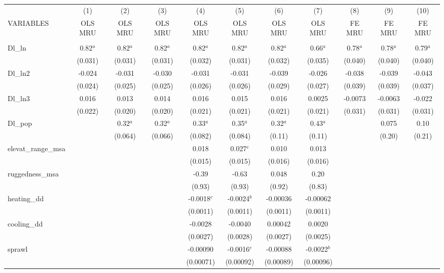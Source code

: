\documentclass[]{article}
\begin{document}
\begin{tabular}{lcccccccccc} \hline
 & (1) & (2) & (3) & (4) & (5) & (6) & (7) & (8) & (9) & (10) \\
VARIABLES & OLS MRU & OLS MRU & OLS MRU & OLS MRU & OLS MRU & OLS MRU & OLS MRU & FE MRU & FE MRU & FE MRU \\ \hline
 &  &  &  &  &  &  &  &  &  &  \\
Dl\_ln & 0.82$^a$ & 0.82$^a$ & 0.82$^a$ & 0.82$^a$ & 0.82$^a$ & 0.82$^a$ & 0.66$^a$ & 0.78$^a$ & 0.78$^a$ & 0.79$^a$ \\
 & (0.031) & (0.031) & (0.031) & (0.032) & (0.031) & (0.032) & (0.035) & (0.040) & (0.040) & (0.040) \\
Dl\_ln2 & -0.024 & -0.031 & -0.030 & -0.031 & -0.031 & -0.039 & -0.026 & -0.038 & -0.039 & -0.043 \\
 & (0.024) & (0.025) & (0.025) & (0.026) & (0.026) & (0.029) & (0.027) & (0.039) & (0.039) & (0.037) \\
Dl\_ln3 & 0.016 & 0.013 & 0.014 & 0.016 & 0.015 & 0.016 & 0.0025 & -0.0073 & -0.0063 & -0.022 \\
 & (0.022) & (0.020) & (0.020) & (0.021) & (0.021) & (0.021) & (0.021) & (0.031) & (0.031) & (0.031) \\
Dl\_pop &  & 0.32$^a$ & 0.32$^a$ & 0.33$^a$ & 0.35$^a$ & 0.32$^a$ & 0.43$^a$ &  & 0.075 & 0.10 \\
 &  & (0.064) & (0.066) & (0.082) & (0.084) & (0.11) & (0.11) &  & (0.20) & (0.21) \\
elevat\_range\_msa &  &  &  & 0.018 & 0.027$^c$ & 0.010 & 0.013 &  &  &  \\
 &  &  &  & (0.015) & (0.015) & (0.016) & (0.016) &  &  &  \\
ruggedness\_msa &  &  &  & -0.39 & -0.63 & 0.048 & 0.20 &  &  &  \\
 &  &  &  & (0.93) & (0.93) & (0.92) & (0.83) &  &  &  \\
heating\_dd &  &  &  & -0.0018$^c$ & -0.0024$^b$ & -0.00036 & -0.00062 &  &  &  \\
 &  &  &  & (0.0011) & (0.0011) & (0.0011) & (0.0011) &  &  &  \\
cooling\_dd &  &  &  & -0.0028 & -0.0040 & 0.00042 & 0.0020 &  &  &  \\
 &  &  &  & (0.0027) & (0.0028) & (0.0027) & (0.0025) &  &  &  \\
sprawl &  &  &  & -0.00090 & -0.0016$^c$ & -0.00088 & -0.0022$^b$ &  &  &  \\
 &  &  &  & (0.00071) & (0.00092) & (0.00089) & (0.00096) &  &  &  \\

\end{tabular}
\end{document}
